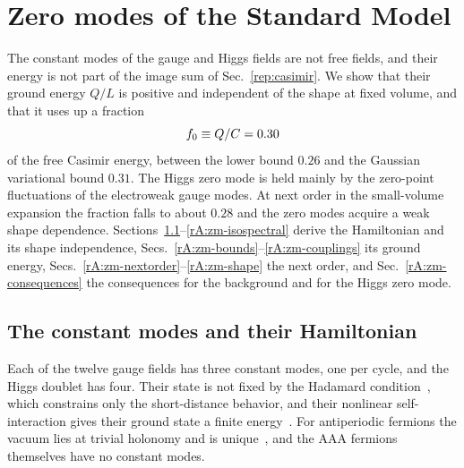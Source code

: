 \section{Zero modes of the Standard Model}\label{rep:zeromodes}

The constant modes of the gauge and Higgs fields are not free fields, and their energy is not part of the image sum of Sec.~\ref{rep:casimir}.
We show that their ground energy $Q/L$ is positive and independent of the shape at fixed volume, and that it uses up a fraction
\begin{equation}
\fzm\equiv Q/C=0.30 %
\label{eq:rA-fzero}
\end{equation}
of the free Casimir energy, between the lower bound $0.26$ and the Gaussian variational bound $0.31$. %
The Higgs zero mode is held mainly by the zero-point fluctuations of the electroweak gauge modes.
At next order in the small-volume expansion the fraction falls to about $0.28$ and the zero modes acquire a weak shape dependence.
Sections~\ref{rA:zm-hamiltonian}--\ref{rA:zm-isospectral} derive the Hamiltonian and its shape independence, Secs.~\ref{rA:zm-bounds}--\ref{rA:zm-couplings} its ground energy, Secs.~\ref{rA:zm-nextorder}--\ref{rA:zm-shape} the next order, and Sec.~\ref{rA:zm-consequences} the consequences for the background and for the Higgs zero mode.

\subsection{The constant modes and their Hamiltonian}
\label{rA:zm-hamiltonian}

Each of the twelve gauge fields has three constant modes, one per cycle, and the Higgs doublet has four.
Their state is not fixed by the Hadamard condition~\cite{Negro:2026ooh}, which constrains only the short-distance behavior, and their nonlinear self-interaction gives their ground state a finite energy~\cite{Luscher:1982uv,Luscher:1982ma}.
For antiperiodic fermions the vacuum lies at trivial holonomy and is unique~\cite{vanBaal:1988va}, and the AAA fermions themselves have no constant modes.

